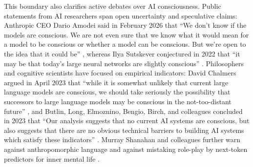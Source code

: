 \documentclass[conference]{IEEEtran}
\begin{document}
This boundary also clarifies active debates over AI consciousness. Public statements from AI researchers span open uncertainty and speculative claims: Anthropic CEO Dario Amodei said in February 2026 that ``We don't know if the models are conscious. We are not even sure that we know what it would mean for a model to be conscious or whether a model can be conscious. But we're open to the idea that it could be'' \cite{amodei2026conscious}, whereas Ilya Sutskever conjectured in 2022 that ``it may be that today's large neural networks are slightly conscious'' \cite{sutskever2022slightly}. Philosophers and cognitive scientists have focused on empirical indicators: David Chalmers argued in April 2023 that ``while it is somewhat unlikely that current large language models are conscious, we should take seriously the possibility that successors to large language models may be conscious in the not-too-distant future'' \cite{chalmers2023could}, and Butlin, Long, Elmoznino, Bengio, Birch, and colleagues concluded in 2023 that ``Our analysis suggests that no current AI systems are conscious, but also suggests that there are no obvious technical barriers to building AI systems which satisfy these indicators'' \cite{butlin2023consciousness}. Murray Shanahan and colleagues further warn against anthropomorphic language and against mistaking role-play by next-token predictors for inner mental life \cite{shanahan2024talking,shanahan2023roleplay}.
\end{document}
